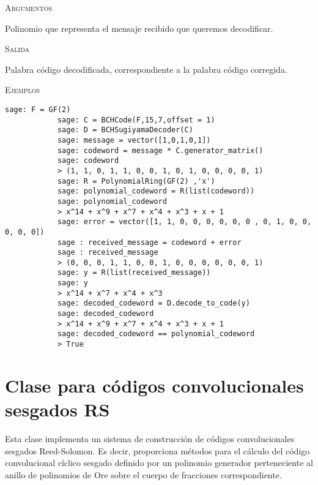 \begin{description}[leftmargin=1em, font=\normalfont\ttfamily, style=nextline]
\begin{description}[font=\ttfamily,style=nextline]
        \textsc{Argumentos}

        \begin{description}[font=\normalfont\ttfamily]
        \item[word] Polinomio que representa el mensaje recibido que queremos decodificar. 
        \end{description}

        \textsc{Salida}

        \begin{description}[font=\normalfont\ttfamily]
            \item[] Palabra código decodificada, correspondiente a la palabra código corregida.
        \end{description}

        \textsc{Ejemplos}

\begin{lstlisting}[gobble=12]
            sage: F = GF(2)
            sage: C = BCHCode(F,15,7,offset = 1)
            sage: D = BCHSugiyamaDecoder(C)
            sage: message = vector([1,0,1,0,1])
            sage: codeword = message * C.generator_matrix()
            sage: codeword
            > (1, 1, 0, 1, 1, 0, 0, 1, 0, 1, 0, 0, 0, 0, 1)
            sage: R = PolynomialRing(GF(2) ,'x')
            sage: polynomial_codeword = R(list(codeword))
            sage: polynomial_codeword
            > x^14 + x^9 + x^7 + x^4 + x^3 + x + 1
            sage: error = vector([1, 1, 0, 0, 0, 0, 0, 0 , 0, 1, 0, 0, 0, 0, 0])
            sage : received_message = codeword + error
            sage : received_message
            > (0, 0, 0, 1, 1, 0, 0, 1, 0, 0, 0, 0, 0, 0, 1)
            sage: y = R(list(received_message))
            sage: y
            > x^14 + x^7 + x^4 + x^3
            sage: decoded_codeword = D.decode_to_code(y)
            sage: decoded_codeword
            > x^14 + x^9 + x^7 + x^4 + x^3 + x + 1
            sage: decoded_codeword == polynomial_codeword
            > True
\end{lstlisting}
    \end{description}
\end{description}

\section{Clase para códigos convolucionales sesgados RS}

Esta clase implementa un sistema de construcción de códigos convolucionales sesgados Reed-Solomon. Es decir, proporciona métodos para el cálculo del código convolucional cíclico sesgado definido por un polinomio generador perteneciente al anillo de polinomios de Ore sobre el cuerpo de fracciones correspondiente.

